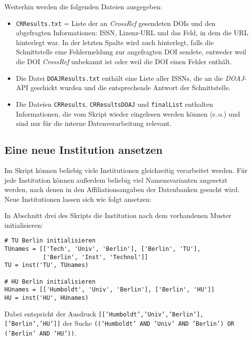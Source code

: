 Weiterhin werden die folgenden Dateien ausgegeben:
\begin{itemize}
	\item \texttt{CRResults.txt} = Liste der an \textit{CrossRef} gesendeten DOIs und den abgefragten Informationen: ISSN, Lizenz-URL und das Feld, in dem die URL hinterlegt war. In der letzten Spalte wird auch hinterlegt, falls die Schnittstelle eine Fehlermeldung zur angefragten DOI sendete, entweder weil die DOI \textit{CrossRef} unbekannt ist oder weil die DOI einen Fehler enthält.
    \item Die Datei \texttt{DOAJResults.txt} enthält eine Liste aller ISSNs, die an die \textit{DOAJ}-API geschickt wurden und die entsprechende Antwort der Schnittstelle.
    \item Die Dateien \texttt{CRResults}, \texttt{CRResultsDOAJ} und \texttt{finalList}
enthalten Informationen, die vom Skript wieder eingelesen werden können (s.\,o.) und sind nur für die interne Datenverarbeitung relevant.
\end{itemize}

\subsection{Eine neue Institution ansetzen} \label{newinst}
Im Skript können beliebig viele Institutionen gleichzeitig verarbeitet werden. Für jede Institution können außerdem beliebig viel Namensvarianten angesetzt werden, nach denen in den Affiliationsangaben der Datenbanken gesucht wird. Neue Institutionen lassen sich wie folgt ansetzen:

In Abschnitt drei des Skripts die Institution nach dem vorhandenen Muster initialisieren:
\begin{verbatim}
# TU Berlin initialisieren
TUnames = [['Tech', 'Univ', 'Berlin'], ['Berlin', 'TU'],
           ['Berlin', 'Inst', 'Technol']]
TU = inst('TU', TUnames)

# HU Berlin initialisieren
HUnames = [['Humboldt', 'Univ', 'Berlin'], ['Berlin', 'HU']]
HU = inst('HU', HUnames)
\end{verbatim}

Dabei entspricht der Ausdruck \texttt{[['Humboldt','Univ','Berlin'], ['Berlin','HU']]} der Suche \texttt{(('Humboldt' AND 'Univ' AND 'Berlin') OR ('Berlin' AND 'HU'))}.

